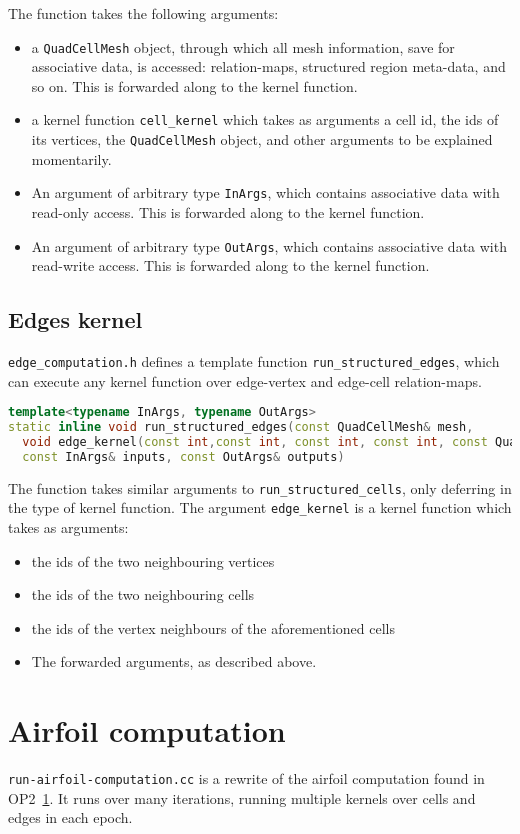 The function takes the following arguments:
\begin{itemize}
\item a \lstinline|QuadCellMesh| object, through which all mesh information, save for associative data, is accessed: relation-maps, structured region meta-data, and so on. This is forwarded along to the kernel function.
\item a kernel function \lstinline|cell_kernel| which takes as arguments a cell id, the ids of its vertices, the \lstinline|QuadCellMesh| object, and other arguments to be explained momentarily.
\item An argument of arbitrary type \lstinline|InArgs|, which contains associative data with read-only access. This is forwarded along to the kernel function.
\item An argument of arbitrary type \lstinline|OutArgs|, which contains associative data with read-write access. This is forwarded along to the kernel function.
\end{itemize}


\subsection{Edges kernel}
\texttt{edge\_computation.h} defines a template function \lstinline|run_structured_edges|, which can execute any kernel function over edge-vertex and edge-cell relation-maps.

\begin{lstlisting}[language=c++]
template<typename InArgs, typename OutArgs>
static inline void run_structured_edges(const QuadCellMesh& mesh,
  void edge_kernel(const int,const int, const int, const int, const QuadNeighbours&, const QuadNeighbours&, const int, const QuadCellMesh&, const InArgs&, const OutArgs&),
  const InArgs& inputs, const OutArgs& outputs)
\end{lstlisting}

The function takes similar arguments to \lstinline|run_structured_cells|, only deferring in the type of kernel function. The argument \lstinline|edge_kernel| is a kernel function which takes as arguments:
\begin{itemize}
\item the ids of the two neighbouring vertices
\item the ids of the two neighbouring cells
\item the ids of the vertex neighbours of the aforementioned cells
\item The forwarded arguments, as described above.
\end{itemize}


\section{Airfoil computation}
\texttt{run-airfoil-computation.cc} is a rewrite of the airfoil computation found in OP2~\ref{}. It runs over many iterations, running multiple kernels over cells and edges in each epoch.
